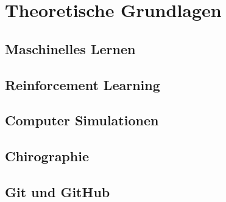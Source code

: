 \chapter{Theoretische Grundlagen}

\section{Maschinelles Lernen}
\label{chap:t_ml}

\section{Reinforcement Learning}
\label{chap:t_rl}

\section{Computer Simulationen}
\label{chap:t_simu}

\section{Chirographie}
\label{chap:t_chiro}

\section{Git und GitHub}
\label{chap:t_git}